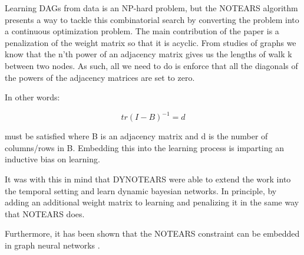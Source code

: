 \documentclass{article}
\begin{document}
Learning DAGs from data is an NP-hard problem, but the NOTEARS algorithm \cite{zheng_dags_2018} presents a way to tackle this combinatorial search by converting the problem into a continuous optimization problem. The main contribution of the paper is a penalization of the weight matrix so that it is acyclic. From studies of graphs we know that the n'th power of an adjacency matrix gives us the lengths of walk k between two nodes. As such, all we need to do is enforce that all the diagonals of the powers of the adjacency matrices are set to zero. 

In other words:

$$ tr(I-B)^{-1} = d $$

must be satisfied where B is an adjacency matrix and d is the number of columns/rows in B. Embedding this into the learning process is imparting an inductive bias on learning. 

It was with this in mind that DYNOTEARS \cite{pamfil_dynotears_2020} were able to extend the work into the temporal setting and learn dynamic bayesian networks. In principle, by adding an additional weight matrix to learning and penalizing it in the same way that NOTEARS does.

Furthermore, it has been shown that the NOTEARS constraint can be embedded in graph neural networks \cite{lachapelle_gradient-based_2020,yu_dag-gnn_nodate}.
\end{document}
